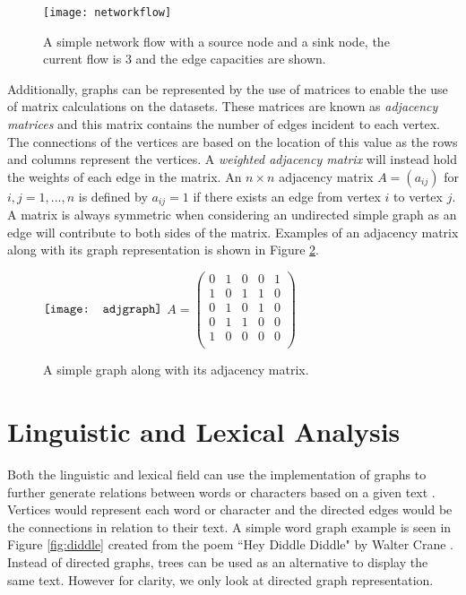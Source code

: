\begin{figure}[!htb]
\centering
\texttt{[image: networkflow]}
\caption{A simple network flow with a source node and a sink node, the current flow is 3 and the edge capacities are shown.}
\label{fig:Network Flow}
\end{figure}

Additionally, graphs can be represented by the use of matrices to enable the use of matrix calculations on the datasets. These matrices are known as \emph{adjacency matrices} \cite{KnauerU.2011Agt:} and this matrix contains the number of edges incident to each vertex. The connections of the vertices are based on the location of this value as the rows and columns represent the vertices. A \emph{weighted adjacency matrix} will instead hold the weights of each edge in the matrix. An $n \times n$ adjacency matrix $A = (a_{ij})$ for $ i, j = 1, ..., n$ is defined by $a_{ij} = 1$ if there exists an edge from vertex $i$ to vertex $j$. A matrix is always symmetric when considering an undirected simple graph as an edge will contribute to both sides of the matrix. Examples of an adjacency matrix along with its graph representation is shown in Figure \ref{fig:Adjacency Graph}.
\newline

\begin{figure}[!htb]
\centering
$\vcenter{\hbox{\texttt{[image: adjgraph]}}}$
\hfill
$A = \begin{pmatrix}
0 & 1 & 0 & 0 & 1 \\
1 & 0 & 1 & 1 & 0 \\
0 & 1 & 0 & 1 & 0 \\
0 & 1 & 1 & 0 & 0 \\
1 & 0 & 0 & 0 & 0 \\
\end{pmatrix} $
\caption{A simple graph along with its adjacency matrix.}
\label{fig:Adjacency Graph}
\end{figure}

\section{Linguistic and Lexical Analysis}
Both the linguistic and lexical field can use the implementation of graphs to further generate relations between words or characters based on a given text \cite{vitevitch2008can}. Vertices would represent each word or character and the directed edges would be the connections in relation to their text. A simple word graph example is seen in Figure \ref{fig:diddle} created from the poem ``Hey Diddle Diddle" by Walter Crane \cite{crane2016baby}. Instead of directed graphs, trees can be used as an alternative to display the same text. However for clarity, we only look at directed graph representation. 

